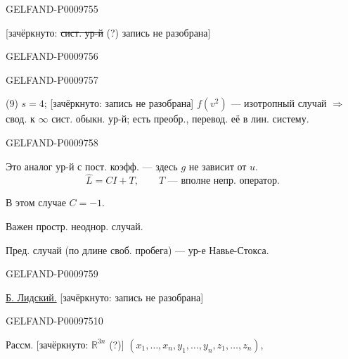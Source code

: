 \begin{GelfandAdjacentEvidence}{GELFAND-P000975}{5}


[зачёркнуто: \sout{сист. ур-й} (?) запись не разобрана]
\end{GelfandAdjacentEvidence}
\begin{GelfandAdjacentEvidence}{GELFAND-P000975}{6}

\end{GelfandAdjacentEvidence}
\begin{GelfandAdjacentEvidence}{GELFAND-P000975}{7}


(9) $s=4$; [зачёркнуто: запись не разобрана] $f(v^2)$ --- изотропный случай $\Rightarrow$
свод. к $\infty$ сист. обыкн. ур-й; есть преобр., перевод. её в лин. систему.
\end{GelfandAdjacentEvidence}
\begin{GelfandAdjacentEvidence}{GELFAND-P000975}{8}



Это аналог ур-й с пост. коэфф. --- здесь $g$ не зависит от $u$.
\begin{equation*}
 \widehat L=CI+T,\qquad T\text{ --- вполне непр. оператор}.
 \tag{10}
\end{equation*}

В этом случае $C=-1$.

Важен простр. неоднор. случай.

Пред. случай (по длине своб. пробега) --- ур-е Навье-Стокса.
\end{GelfandAdjacentEvidence}
\begin{GelfandAdjacentEvidence}{GELFAND-P000975}{9}


\underline{Б. Лидский.} [зачёркнуто: запись не разобрана]
\end{GelfandAdjacentEvidence}
\begin{GelfandAdjacentEvidence}{GELFAND-P000975}{10}


Рассм. [зачёркнуто: \sout{\(\mathbb R^{3n}\)} (?)]
$(x_1,\ldots,x_n,y_1,\ldots,y_n,z_1,\ldots,z_n)$,
\end{GelfandAdjacentEvidence}

